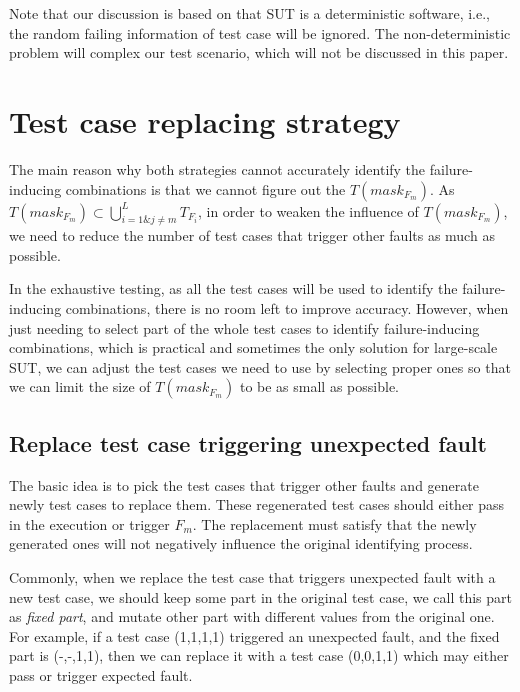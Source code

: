 \documentclass{sig-alternate}
\begin{document}
Note that our discussion is based on that SUT is a deterministic software, i.e., the random failing information of test case will be ignored. The non-deterministic problem will complex our test scenario, which will not be discussed in this paper.

\section{Test case replacing strategy}
The main reason why both strategies cannot accurately identify the failure-inducing combinations is that we cannot figure out the $T(mask_{F_{m}})$.  As $T(mask_{F_{m}}) \subset \bigcup_{i = 1 \& j \neq m }^{L}T_{F_{i}}$, in order to weaken the influence of $T(mask_{F_{m}})$, we need to reduce the number of test cases that trigger other faults as much as possible.

In the exhaustive testing, as all the test cases will be used to identify the failure-inducing combinations, there is no room left to improve accuracy. However, when just needing to select part of the whole test cases to identify failure-inducing combinations, which is practical and sometimes the only solution for large-scale SUT, we can adjust the test cases we need to use by selecting proper ones so that we can limit the size of $T(mask_{F_{m}})$ to be as small as possible.

\subsection{Replace test case triggering unexpected fault}

The basic idea is to pick the test cases that trigger other faults and generate newly test cases to replace them. These regenerated test cases should either pass in the execution or trigger $F_{m}$. The replacement must satisfy that the newly generated ones will not negatively influence the original identifying process.

Commonly, when we replace the test case that triggers unexpected fault with a new test case, we should keep some part in the original test case, we call this part as \emph{fixed part}, and mutate other part with different values from the original one. For example, if a test case (1,1,1,1) triggered an unexpected fault, and the fixed part is (-,-,1,1), then we can replace it with a test case (0,0,1,1) which may either pass or trigger expected fault.
\end{document}

